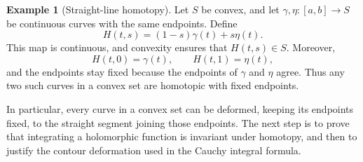 \documentclass[11pt]{article}
\theoremstyle{plain}
\theoremstyle{definition}
\newtheorem{example}[theorem]{Example}
\theoremstyle{remark}
\numberwithin{equation}{section}
\begin{document}
\begin{example}[Straight-line homotopy]
Let $S$ be convex, and let $\gamma,\eta\colon[a,b]\to S$ be continuous
curves with the same endpoints. Define
\begin{equation}\label{eq:straight-homotopy}
 H(t,s)=(1-s)\gamma(t)+s\eta(t).
\end{equation}
This map is continuous, and convexity ensures that $H(t,s)\in S$.
Moreover,
\[
 H(t,0)=\gamma(t),\qquad H(t,1)=\eta(t),
\]
and the endpoints stay fixed because the endpoints of $\gamma$ and
$\eta$ agree. Thus any two such curves in a convex set are homotopic
with fixed endpoints.
\end{example}
In particular, every curve in a convex set can be deformed, keeping its
endpoints fixed, to the straight segment joining those endpoints.
The next step is to prove that integrating a holomorphic function is
invariant under homotopy, and then to justify the contour deformation
used in the Cauchy integral formula.
\end{document}
